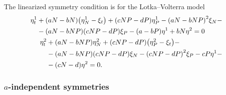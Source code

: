 The linearized symmetry condition  is for the Lotka--Volterra model
\begin{subequations}\label{eq:lotka-volterra-lin-symmetry-cond}
  \begin{align}
    \begin{split}
      \eta^1_t &+ \qty(a N - b N) \qty(\eta^1_{N} - \xi_t) + \qty(c N P - d P) \eta^1_{P} - \qty(a N - b N P)^2 \xi_{N} -\\
      &- \qty(a N - b N P) \qty(c N P - d P) \xi_{P} - \qty(a - b P) \eta^1 + b N \eta^2 = 0
    \end{split}\\
    \begin{split}
      \eta^2_t &+ \qty(a N - b N P) \eta^2_{N} + \qty(c N P - d P) \qty(\eta^2_{P} - \xi_t) -\\
      &- \qty(a N - b N P) \qty(c N P - d P) \xi_{N} - \qty(c N P - d P)^2 \xi_{P} - c P \eta^1 -\\
      &- \qty(c N - d) \eta^2 = 0.
    \end{split}
  \end{align}
\end{subequations}

\subsubsection{\texorpdfstring{\(a\)-independent symmetries}{a-independent symmetries}}

